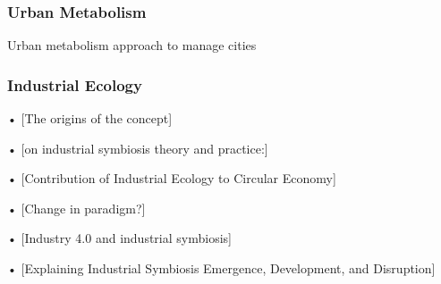 \subsubsection{Urban Metabolism}


Urban metabolism approach to manage cities \parencite{Kalmykova2015}





\subsubsection{Industrial Ecology}
•	[The origins of the concept] \par
\parencite{Jelinski1992}\par


•	[on industrial symbiosis theory and practice:] \parencite{Zhang2015a} \par

•	[Contribution of Industrial Ecology to Circular Economy] \par \parencite{Saavedra2018} \par

•	[Change in paradigm?] \parencite{Ehrenfeld2000} \par

•	[Industry 4.0 and industrial symbiosis] \par
\parencite{Tseng2018}\par


•	[Explaining Industrial Symbiosis Emergence, Development, and Disruption]\par \parencite{Yap2017}\par








